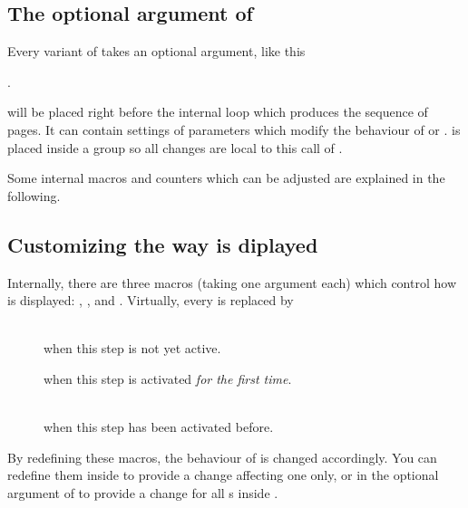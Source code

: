 \documentclass[12pt]{scrartcl}
\let\newslide=\relax
\begin{document}
  \subsection{The optional argument of }%
  Every variant of  takes an optional argument, like this
  \begin{center}
    .
  \end{center}
   will be placed right before the internal loop which produces the sequence of pages.  It can
  contain settings of parameters which modify the behaviour of  or . 
  is placed inside a group so all changes are local to this call of .

  Some internal macros and counters which can be adjusted are explained in the following.

  \newslide

  \subsection{Customizing the way  is diplayed}\label{Sec:displaycustom}%
  Internally, there are three macros (taking one argument each) which control how  is displayed:
  ,
  , and
  . Virtually, every
   is replaced by
  \begin{description}
  \item[]\mbox{}\\ when this step is not yet active.
  \item[] when this step is
    activated \emph{for the first time}.
  \item[]\mbox{}\\
    when this step has been activated before.
  \end{description}

  By redefining these macros, the behaviour of  is changed accordingly. You can redefine them inside
   to provide a change affecting one  only, or in the optional argument of
   to provide a change for all s inside .
\end{document}
